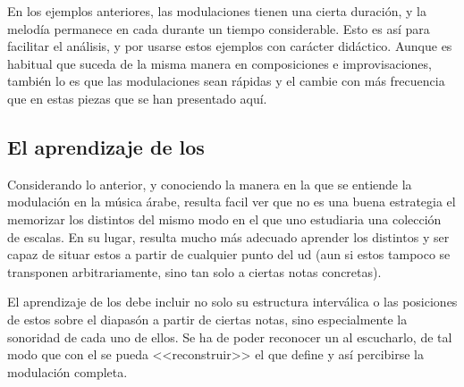 \vspace*{.5cm}



En los ejemplos anteriores, las modulaciones tienen una cierta duración, y la melodía permanece en cada \yins durante un tiempo considerable. Esto es así para facilitar el análisis, y por usarse estos ejemplos con carácter didáctico. Aunque es habitual que suceda de la misma manera en composiciones e improvisaciones, también lo es que las modulaciones sean rápidas y el \yins cambie con más frecuencia que en estas piezas que se han presentado aquí.

\subsection{El aprendizaje de los \maqamaat}

Considerando lo anterior, y conociendo la manera en la que se entiende la modulación en la música árabe, resulta facil ver que no es una buena estrategia el memorizar los distintos \maqamaat del mismo modo en el que uno estudiaria una colección de escalas. En su lugar, resulta mucho más adecuado aprender los distintos \ashnas y ser capaz de situar estos a partir de cualquier punto del ud (aun si estos tampoco se transponen arbitrariamente, sino tan solo a ciertas notas concretas).

El aprendizaje de los \ashnas debe incluir no solo su estructura interválica o las posiciones de estos sobre el diapasón a partir de ciertas notas, sino especialmente la sonoridad de cada uno de ellos. Se ha de poder reconocer un \yins al escucharlo, de tal modo que con el se pueda <<reconstruir>> el \maqam que define y así percibirse la modulación completa.
